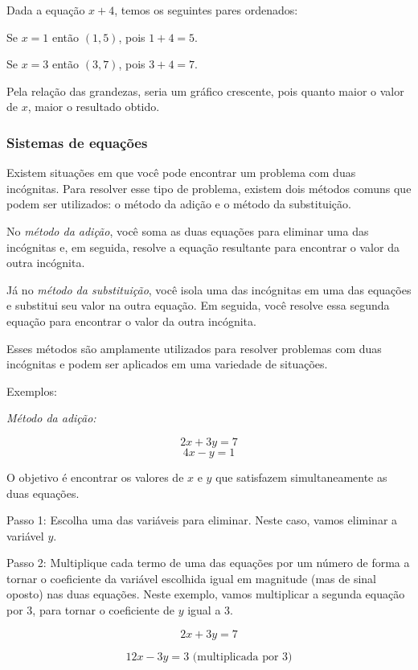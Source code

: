 {\medskip{}


Dada a equação $x + 4$, temos os seguintes pares ordenados: 

Se $x = 1$ então $(1,5)$, pois $1 + 4 = 5$.

Se $x = 3$ então $(3,7)$, pois $3 + 4 = 7$.

Pela relação das grandezas, seria um gráfico crescente, pois quanto
maior o valor de $x$, maior o resultado obtido.



\subsubsection{Sistemas de equações}

Existem situações em que você pode encontrar um problema com duas incógnitas. Para resolver esse tipo de problema, existem dois métodos comuns que podem ser utilizados: o método da adição e o método da substituição.

No \textit{método da adição}, você soma as duas equações para eliminar uma das incógnitas e, em seguida, resolve a equação resultante para encontrar o valor da outra incógnita.

Já no \textit{método da substituição}, você isola uma das incógnitas em uma das equações e substitui seu valor na outra equação. Em seguida, você resolve essa segunda equação para encontrar o valor da outra incógnita.

Esses métodos são amplamente utilizados para resolver problemas com duas incógnitas e podem ser aplicados em uma variedade de situações.

\noindent Exemplos:

\textit{Método da adição:} 

$$2x + 3y = 7$$ 
$$4x - y = 1$$

O objetivo é encontrar os valores de $x$ e $y$ que satisfazem
simultaneamente as duas equações.

Passo 1: Escolha uma das variáveis para eliminar. Neste caso, vamos
eliminar a variável $y$.

Passo 2: Multiplique cada termo de uma das equações por um número de
forma a tornar o coeficiente da variável escolhida igual em magnitude
(mas de sinal oposto) nas duas equações. Neste exemplo, vamos
multiplicar a segunda equação por 3, para tornar o coeficiente de $y$ igual a 3.

$$2x + 3y = 7$$ 

$$12x - 3y = 3 \text{ (multiplicada por 3)}$$

}
